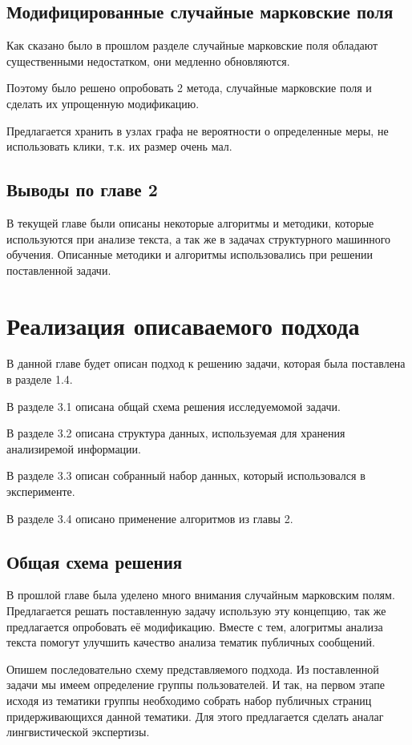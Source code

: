\documentclass[annotation,times,page4]{itmo-student-thesis}
\begin{document}
\section{Модифицированные случайные марковские поля}
Как сказано было в прошлом разделе случайные марковские поля обладают существенными недостатком, они медленно обновляются.

Поэтому было решено опробовать 2 метода, случайные марковские поля и сделать их упрощенную модификацию.

Предлагается хранить в узлах графа не вероятности о определенные меры, не использовать клики, т.к. их размер очень мал.

\section{Выводы по главе 2}
В текущей главе были описаны некоторые алгоритмы и методики, которые используются при анализе текста, а так же в задачах структурного машинного обучения. Описанные методики и алгоритмы использовались при решении поставленной задачи.
 
\chapter{Реализация описаваемого подхода}
В данной главе будет описан подход к решению задачи, которая была поставлена в разделе 1.4.

В разделе 3.1 описана общай схема решения исследуемомой задачи. 

В разделе 3.2 описана структура данных, используемая для хранения анализиремой информации. 

В разделе 3.3 описан собранный набор данных, который использовался в эксперименте.

В разделе 3.4 описано применение алгоритмов из главы 2.

\section{Общая схема решения}
В прошлой главе была уделено много внимания случайным марковским полям. Предлагается решать поставленную задачу использую эту концепцию, так же предлагается опробовать её модификацию. Вместе с тем, алогритмы анализа текста помогут улучшить качество анализа тематик публичных сообщений.

Опишем последовательно схему представляемого подхода. Из поставленной задачи мы имеем определение группы пользователей. И так, на первом этапе исходя из тематики группы необходимо собрать набор публичных страниц придерживающихся данной тематики. Для этого предлагается сделать аналаг лингвистической экспертизы. 
\end{document}
